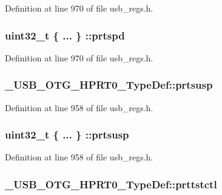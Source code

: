 Definition at line 970 of file usb\-\_\-regs.\-h.

\hypertarget{group___u_s_b___o_t_g___d_r_i_v_e_r_ga2b64b47f95306a60bc6db58dfd02d441}{
\subsubsection[{prtspd}]{\setlength{\rightskip}{0pt plus 5cm}uint32\-\_\-t \{ ... \} \-::prtspd}}\label{group___u_s_b___o_t_g___d_r_i_v_e_r_ga2b64b47f95306a60bc6db58dfd02d441}


Definition at line 970 of file usb\-\_\-regs.\-h.

\hypertarget{group___u_s_b___o_t_g___d_r_i_v_e_r_gaf714b32bdd6fe785663dc5bebc92ee0e}{
\subsubsection[{prtsusp}]{ \-\_\-\-U\-S\-B\-\_\-\-O\-T\-G\-\_\-\-H\-P\-R\-T0\-\_\-\-Type\-Def\-::prtsusp}}\label{group___u_s_b___o_t_g___d_r_i_v_e_r_gaf714b32bdd6fe785663dc5bebc92ee0e}


Definition at line 958 of file usb\-\_\-regs.\-h.

\hypertarget{group___u_s_b___o_t_g___d_r_i_v_e_r_gaf0ea6f79501ff19f7329951c9f9aab15}{
\subsubsection[{prtsusp}]{\setlength{\rightskip}{0pt plus 5cm}uint32\-\_\-t \{ ... \} \-::prtsusp}}\label{group___u_s_b___o_t_g___d_r_i_v_e_r_gaf0ea6f79501ff19f7329951c9f9aab15}


Definition at line 958 of file usb\-\_\-regs.\-h.

\hypertarget{group___u_s_b___o_t_g___d_r_i_v_e_r_gaa103b41b4bc60256a25f3c9cd541f2fc}{
\subsubsection[{prttstctl}]{ \-\_\-\-U\-S\-B\-\_\-\-O\-T\-G\-\_\-\-H\-P\-R\-T0\-\_\-\-Type\-Def\-::prttstctl}}\label{group___u_s_b___o_t_g___d_r_i_v_e_r_gaa103b41b4bc60256a25f3c9cd541f2fc}


